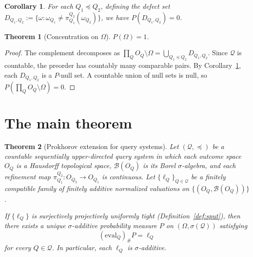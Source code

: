 \documentclass[11pt]{article}
\newtheorem{theorem}{Theorem}
\newtheorem{corollary}{Corollary}
\theoremstyle{definition}
\newcommand{\Qcal}{\mathcal{Q}}
\newcommand{\Bcal}{\mathcal{B}}
\begin{document}
\begin{corollary}
\label{cor:defect-null}
For each $Q_1 \preceq Q_2$, defining the defect set
$D_{Q_1,Q_2} := \{\omega : \omega_{Q_1} \neq
\pi^{Q_2}_{Q_1}(\omega_{Q_2})\}$, we have $P(D_{Q_1,Q_2}) = 0$.
\end{corollary}

\begin{theorem}[Concentration on $\Omega$]
\label{thm:concentration}
$P(\Omega) = 1$.
\end{theorem}

\begin{proof}
The complement decomposes as
$\prod_Q O_Q \setminus \Omega = \bigcup_{Q_1 \preceq Q_2}
D_{Q_1,Q_2}$.
Since $\Qcal$ is countable, the preorder has countably many
comparable pairs.  By Corollary~\ref{cor:defect-null}, each
$D_{Q_1,Q_2}$ is a $P$-null set.  A countable union of null sets
is null, so $P(\prod_Q O_Q \setminus \Omega) = 0$.
\end{proof}

\section{The main theorem}\label{sec:main}

\begin{theorem}[Prokhorov extension for query systems]
\label{thm:main}
Let $(\Qcal, \preceq)$ be a countable sequentially upper-directed
query system in which each outcome space $O_Q$ is a Hausdorff
topological space, $\Bcal(O_Q)$ is its Borel $\sigma$-algebra, and
each refinement map $\pi^{Q_2}_{Q_1} : O_{Q_2} \to O_{Q_1}$ is
continuous.  Let $\{\ell_Q\}_{Q \in \Qcal}$ be a finitely compatible
family of finitely additive normalized valuations on $\{(O_Q,
\Bcal(O_Q))\}$.

If $\{\ell_Q\}$ is surjectively projectively uniformly tight
(Definition~\ref{def:sput}), then there exists a unique
$\sigma$-additive probability measure $P$ on
$(\Omega, \sigma(\Qcal))$ satisfying
\[
(\mathrm{eval}_Q)_\# P = \ell_Q
\]
for every $Q \in \Qcal$.  In particular, each $\ell_Q$ is
$\sigma$-additive.
\end{theorem}
\end{document}
